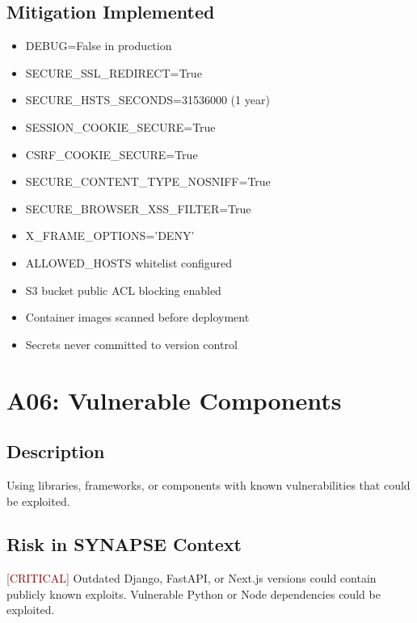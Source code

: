 \documentclass{report}
\begin{document}
\subsection{Mitigation Implemented}
\begin{itemize}
\item DEBUG=False in production
\item SECURE\_SSL\_REDIRECT=True
\item SECURE\_HSTS\_SECONDS=31536000 (1 year)
\item SESSION\_COOKIE\_SECURE=True
\item CSRF\_COOKIE\_SECURE=True
\item SECURE\_CONTENT\_TYPE\_NOSNIFF=True
\item SECURE\_BROWSER\_XSS\_FILTER=True
\item X\_FRAME\_OPTIONS='DENY'
\item ALLOWED\_HOSTS whitelist configured
\item S3 bucket public ACL blocking enabled
\item Container images scanned before deployment
\item Secrets never committed to version control
\end{itemize}

\section{A06: Vulnerable Components}

\subsection{Description}
Using libraries, frameworks, or components with known vulnerabilities that could be exploited.

\subsection{Risk in SYNAPSE Context}
\textcolor{darkred}{[CRITICAL]} Outdated Django, FastAPI, or Next.js versions could contain publicly known exploits. Vulnerable Python or Node dependencies could be exploited.
\end{document}
